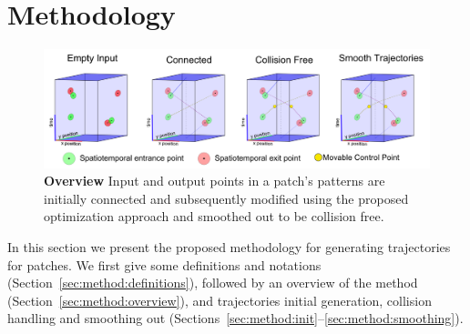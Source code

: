 \section{Methodology}
\label{sec:method}

\begin{figure}[t]
	\begin{center}
	\includegraphics[width=0.9\linewidth]{./images/overview-hd.png}
	\caption{
		\textbf{Overview} Input and output points in a patch's patterns are initially connected and subsequently modified using the proposed optimization approach and smoothed out to be collision free.
	}
	\label{fig:overview}
	\end{center}
\end{figure}


In this section we present the proposed methodology for generating trajectories for patches.
We first give some definitions and notations (Section~\ref{sec:method:definitions}), followed by an overview of the method (Section~\ref{sec:method:overview}), and trajectories initial generation, collision handling and smoothing out (Sections~\ref{sec:method:init}--\ref{sec:method:smoothing}).

